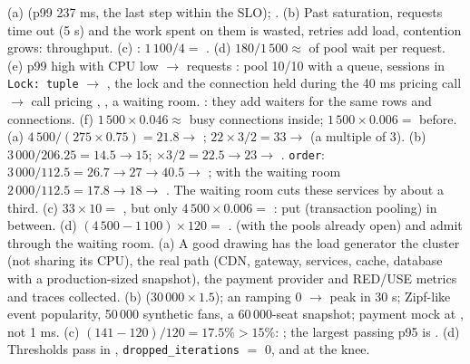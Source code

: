  (a)  (p99 237 ms, the last step within the SLO); . (b) Past saturation, requests time out (5 s) and the work spent on them is wasted, retries add load, contention grows:  throughput. (c) : $1\,100/4 =$ . (d) $180/1\,500 \approx$  of pool wait per request. (e) p99 high with CPU low $\to$ requests : pool 10/10 with a queue, sessions in \texttt{Lock: tuple} $\to$ , the lock and the connection held during the 40 ms pricing call $\to$ call pricing , , a waiting room. : they add waiters for the same rows and connections. (f) $1\,500 \times 0.046 \approx$  busy connections inside; $1\,500 \times 0.006 =$  before.
 (a) $4\,500/(275 \times 0.75) = 21.8 \to$ ; $22 \times 3/2 = 33 \to$  (a multiple of 3). (b) $3\,000/206.25 = 14.5 \to 15$; $\times 3/2 = 22.5 \to 23 \to$ . \texttt{order}: $3\,000/112.5 = 26.7 \to 27 \to 40.5 \to$ ; with the waiting room $2\,000/112.5 = 17.8 \to 18 \to$ . The waiting room cuts these services by about a third. (c) $33 \times 10 =$ , but only $4\,500 \times 0.006 =$ : put  (transaction pooling) in between. (d) $(4\,500 - 1\,100) \times 120 =$ .  (with the pools already open) and admit through the waiting room.
 (a) A good drawing has the load generator  the cluster (not sharing its CPU), the real path (CDN, gateway, services, cache, database with a production-sized snapshot), the payment provider  and RED/USE metrics and traces collected. (b)  ($30\,000 \times 1.5$); an  ramping 0 $\to$ peak in 30 s; Zipf-like event popularity, 50\,000 synthetic fans, a 60\,000-seat snapshot; payment mock at , not 1 ms. (c) $(141 - 120)/120 = 17.5\% > 15\%$: ; the largest passing p95 is . (d) Thresholds pass in , \texttt{dropped\_iterations} $=$ 0, and  at the knee.
